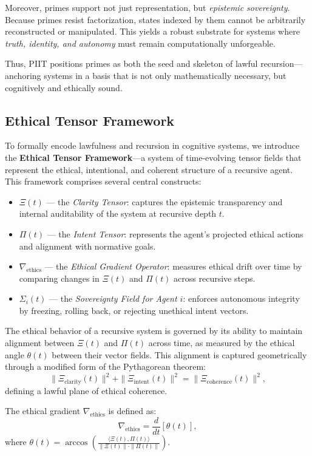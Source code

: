 \documentclass[12]{amsart}
\theoremstyle{plain}
\begin{document}
Moreover, primes support not just representation, but \emph{epistemic sovereignty}. Because primes resist factorization, states indexed by them cannot be arbitrarily reconstructed or manipulated. This yields a robust substrate for systems where \emph{truth, identity, and autonomy} must remain computationally unforgeable.

Thus, PIIT positions primes as both the seed and skeleton of lawful recursion—anchoring systems in a basis that is not only mathematically necessary, but cognitively and ethically sound.

\subsection{Ethical Tensor Framework}

To formally encode lawfulness and recursion in cognitive systems, we introduce the \textbf{Ethical Tensor Framework}—a system of time-evolving tensor fields that represent the ethical, intentional, and coherent structure of a recursive agent. This framework comprises several central constructs:

\begin{itemize}
  \item $\Xi(t)$ — the \textit{Clarity Tensor}: captures the epistemic transparency and internal auditability of the system at recursive depth $t$.
  \item $\Pi(t)$ — the \textit{Intent Tensor}: represents the agent’s projected ethical actions and alignment with normative goals.
  \item $\nabla_{\text{ethics}}$ — the \textit{Ethical Gradient Operator}: measures ethical drift over time by comparing changes in $\Xi(t)$ and $\Pi(t)$ across recursive steps.
  \item $\Sigma_i(t)$ — the \textit{Sovereignty Field for Agent $i$}: enforces autonomous integrity by freezing, rolling back, or rejecting unethical intent vectors.
\end{itemize}

The ethical behavior of a recursive system is governed by its ability to maintain alignment between $\Xi(t)$ and $\Pi(t)$ across time, as measured by the ethical angle $\theta(t)$ between their vector fields. This alignment is captured geometrically through a modified form of the Pythagorean theorem:
\[
\|\Xi_{\text{clarity}}(t)\|^2 + \|\Xi_{\text{intent}}(t)\|^2 = \|\Xi_{\text{coherence}}(t)\|^2,
\]
defining a lawful plane of ethical coherence.

The ethical gradient $\nabla_{\text{ethics}}$ is defined as:
\[
\nabla_{\text{ethics}} = \frac{d}{dt} \left[ \theta(t) \right],
\]
where $\theta(t) = \arccos \left( \frac{ \langle \Xi(t), \Pi(t) \rangle }{ \|\Xi(t)\| \cdot \|\Pi(t)\| } \right)$.
\end{document}
